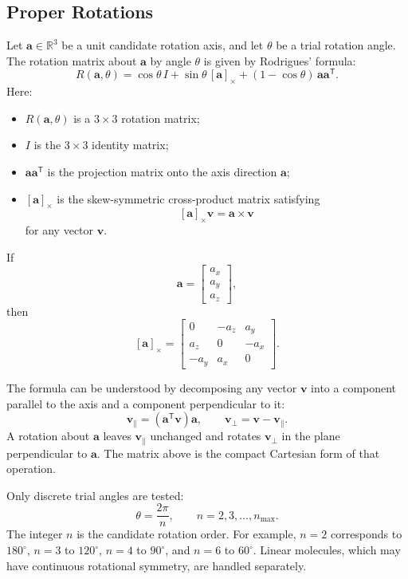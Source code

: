 \documentclass[11pt]{article}
\newcommand{\R}{\mathbb{R}}
\newcommand{\T}{\mathsf{T}}
\begin{document}
\subsection{Proper Rotations}

Let \(\mathbf a\in\R^3\) be a unit candidate rotation axis, and let \(\theta\)
be a trial rotation angle.  The rotation matrix about \(\mathbf a\) by angle
\(\theta\) is given by Rodrigues' formula:
\[
    R(\mathbf a,\theta)
    =
    \cos\theta\, I
    +
    \sin\theta\, [\mathbf a]_\times
    +
    (1-\cos\theta)\,\mathbf a\mathbf a^{\T}.
\]
Here:
\begin{itemize}
    \item \(R(\mathbf a,\theta)\) is a \(3\times 3\) rotation matrix;
    \item \(I\) is the \(3\times 3\) identity matrix;
    \item \(\mathbf a\mathbf a^{\T}\) is the projection matrix onto the axis
    direction \(\mathbf a\);
    \item \([\mathbf a]_\times\) is the skew-symmetric cross-product matrix
    satisfying
    \[
        [\mathbf a]_\times \mathbf v = \mathbf a\times\mathbf v
    \]
    for any vector \(\mathbf v\).
\end{itemize}
If
\[
    \mathbf a =
    \begin{bmatrix}
    a_x\\ a_y\\ a_z
    \end{bmatrix},
\]
then
\[
    [\mathbf a]_\times
    =
    \begin{bmatrix}
    0 & -a_z & a_y\\
    a_z & 0 & -a_x\\
    -a_y & a_x & 0
    \end{bmatrix}.
\]

The formula can be understood by decomposing any vector \(\mathbf v\) into a
component parallel to the axis and a component perpendicular to it:
\[
    \mathbf v_\parallel = (\mathbf a^{\T}\mathbf v)\mathbf a,
    \qquad
    \mathbf v_\perp = \mathbf v-\mathbf v_\parallel.
\]
A rotation about \(\mathbf a\) leaves \(\mathbf v_\parallel\) unchanged and
rotates \(\mathbf v_\perp\) in the plane perpendicular to \(\mathbf a\).  The
matrix above is the compact Cartesian form of that operation.

Only discrete trial angles are tested:
\[
    \theta = \frac{2\pi}{n},
    \qquad
    n=2,3,\dots,n_{\max}.
\]
The integer \(n\) is the candidate rotation order.  For example, \(n=2\)
corresponds to \(180^\circ\), \(n=3\) to \(120^\circ\), \(n=4\) to
\(90^\circ\), and \(n=6\) to \(60^\circ\).  Linear molecules, which may have
continuous rotational symmetry, are handled separately.
\end{document}

